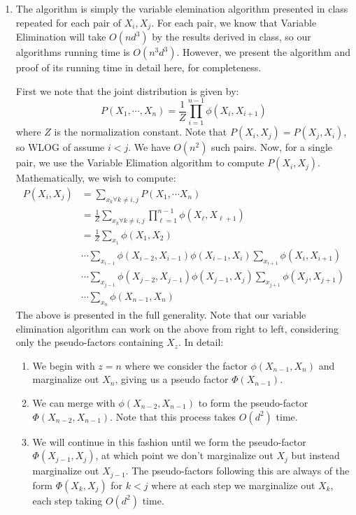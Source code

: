 \documentclass[12pt]{article}
\begin{document}
\begin{enumerate}[label=(\alph*)]
  \item The algorithm is simply the variable elemination algorithm presented in class repeated for each pair of $X_i, X_j$. For each pair, we know that Variable Elimination will take $O(nd^3)$ by the results derived in class, so our algorithms running time is $O(n^3d^3)$. However, we present the algorithm and proof of its running time in detail here, for completeness. 

  First we note that the joint distribution is given by:
  $$
  	P(X_1, \cdots, X_n) = \frac{1}{Z}\prod_{i=1}^{n-1} \phi(X_i, X_{i+1})
  $$
  where $Z$ is the normalization constant. Note that $P(X_i, X_j) = P(X_j, X_i)$, so WLOG of assume $i < j$. We have $O(n^2)$ such pairs. Now, for a single pair, we use the Variable Elimation algorithm to compute $P(X_i, X_j)$. Mathematically, we wish to compute:
  \begin{align*}
  	P(X_i, X_j) &= \sum_{x_k \forall k \neq i,j} P(X_1, \cdots X_n) \\
  	&= \frac{1}{Z} \sum_{x_k \forall k \neq i,j} \prod_{\ell = 1}^{n-1}\phi(X_{\ell}, X_{\ell+1}) \\
  	&=\frac{1}{Z} \sum_{x_1} \phi(X_1, X_2) \\
  	&\cdots \sum_{x_{i-1}}\phi(X_{i-2}, X_{i-1})\phi(X_{i-1}, X_{i}) \sum_{x_{i+1}} \phi(X_i, X_{i+1}) \\
  	&\cdots \sum_{x_{j-1}}\phi(X_{j-2}, X_{j-1})\phi(X_{j-1}, X_{j}) \sum_{x_{j+1}} \phi(X_j, X_{j+1}) \\
  	&\cdots \sum_{x_n} \phi(X_{n-1}, X_n)
  \end{align*}
  The above is presented in the full generality. Note that our variable elimination algorithm can work on the above from right to left, considering only the pseudo-factors containing $X_z$. In detail:
  \begin{enumerate}
  	\item We begin with $z=n$ where we consider the factor $\phi(X_{n-1}, X_n)$ and marginalize out $X_n$, giving us a pseudo factor $\Phi(X_{n-1})$.
  	\item We can merge with $\phi(X_{n-2}, X_{n-1})$ to form the pseudo-factor $\Phi(X_{n-2}, X_{n-1})$. Note that this process takes $O(d^2)$ time.
  	\item We will continue in this fashion until we form the pseudo-factor $\Phi(X_{j-1}, X_j)$, at which point we don't marginalize out $X_j$ but instead marginalize out $X_{j-1}$. The pseudo-factors following this are always of the form $\Phi(X_k, X_j)$ for $k < j$ where at each step we marginalize out $X_k$, each step taking $O(d^2)$ time. 

\end{enumerate}
\end{enumerate}
\end{document}
